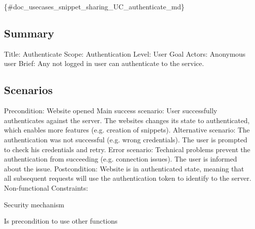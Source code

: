 \{\#doc\+\_\+usecases\+\_\+snippet\+\_\+sharing\+\_\+\+U\+C\+\_\+authenticate\+\_\+md\}

\subsection*{Summary}

Title\+: Authenticate Scope\+: Authentication Level\+: User Goal Actors\+: Anonymous user Brief\+: Any not logged in user can authenticate to the service.

\subsection*{Scenarios}

Precondition\+: Website opened Main success scenario\+: User successfully authenticates against the server. The websites changes its state to authenticated, which enables more features (e.\+g. creation of snippets). Alternative scenario\+: The authentication was not successful (e.\+g. wrong credentials). The user is prompted to check his credentials and retry. Error scenario\+: Technical problems prevent the authentication from succeeding (e.\+g. connection issues). The user is informed about the issue. Postcondition\+: Website is in authenticated state, meaning that all subsequent requests will use the authentication token to identify to the server. Non-\/functional Constraints\+:
\begin{DoxyItemize}
\item Security mechanism
\item Is precondition to use other functions 
\end{DoxyItemize}